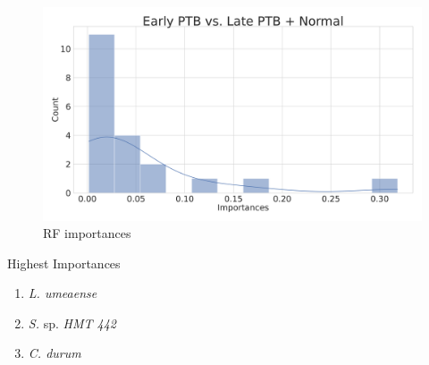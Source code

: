 \documentclass{beamer}
\begin{document}
\begin{frame}[allowframebreaks]
        \begin{figure}
            \includegraphics[width=0.8 \linewidth]{figures/RandomForest_Proportion/RF-two.DADA2.homd.Mouth/importances.pdf}
            \caption{RF importances}
        \end{figure}

        \begin{block}{Highest Importances}
            \begin{enumerate}
                \item \textit{L. umeaense}
                \item \textit{S.} sp. \textit{HMT 442}
                \item \textit{C. durum}
            \end{enumerate}
        \end{block}
    \end{frame}
\end{document}
